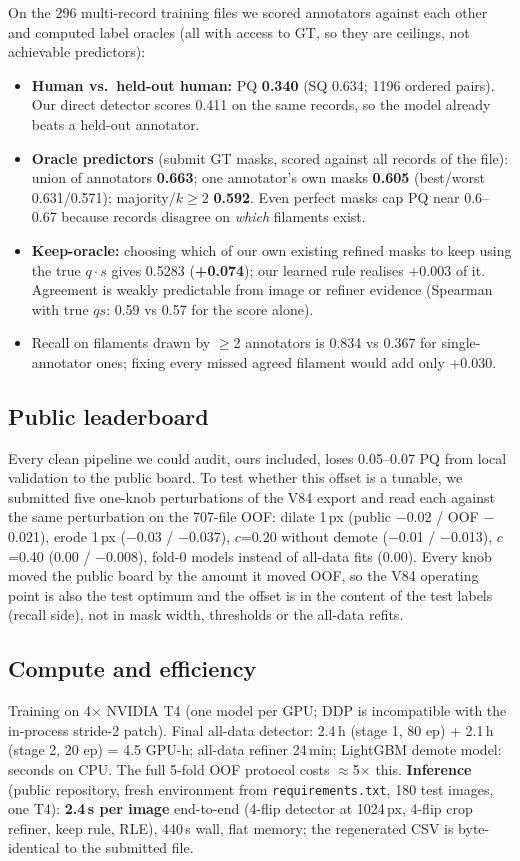 \documentclass[sigconf]{acmart}
\begin{document}
On the 296 multi-record training files we scored annotators against each other and computed label oracles (all with access to GT, so they are ceilings, not achievable predictors):
\begin{itemize}
\item \textbf{Human vs.\ held-out human:} PQ \textbf{0.340} (SQ 0.634; 1196 ordered pairs). Our direct detector scores 0.411 on the same records, so the model already beats a held-out annotator.
\item \textbf{Oracle predictors} (submit GT masks, scored against all records of the file): union of annotators \textbf{0.663}; one annotator's own masks \textbf{0.605} (best/worst 0.631/0.571); majority/$k\ge2$ \textbf{0.592}. Even perfect masks cap PQ near 0.6--0.67 because records disagree on \emph{which} filaments exist.
\item \textbf{Keep-oracle:} choosing which of our own existing refined masks to keep using the true $q\cdot s$ gives 0.5283 (\textbf{+0.074}); our learned rule realises +0.003 of it. Agreement is weakly predictable from image or refiner evidence (Spearman with true $qs$: 0.59 vs 0.57 for the score alone).
\item Recall on filaments drawn by $\ge$2 annotators is 0.834 vs 0.367 for single-annotator ones; fixing every missed agreed filament would add only +0.030.
\end{itemize}

\subsection{Public leaderboard}\label{sec:lb}
Every clean pipeline we could audit, ours included, loses 0.05--0.07 PQ from local validation to the public board. To test whether this offset is a tunable, we submitted five one-knob perturbations of the V84 export and read each against the same perturbation on the 707-file OOF: dilate 1\,px (public $-$0.02 / OOF $-$0.021), erode 1\,px ($-$0.03 / $-$0.037), $c$=0.20 without demote ($-$0.01 / $-$0.013), $c$=0.40 (0.00 / $-$0.008), fold-0 models instead of all-data fits (0.00). Every knob moved the public board by the amount it moved OOF, so the V84 operating point is also the test optimum and the offset is in the content of the test labels (recall side), not in mask width, thresholds or the all-data refits.

\subsection{Compute and efficiency}
Training on 4$\times$ NVIDIA T4 (one model per GPU; DDP is incompatible with the in-process stride-2 patch). Final all-data detector: 2.4\,h (stage 1, 80 ep) + 2.1\,h (stage 2, 20 ep) = 4.5 GPU-h; all-data refiner 24\,min; LightGBM demote model: seconds on CPU. The full 5-fold OOF protocol costs $\approx$5$\times$ this. \textbf{Inference} (public repository, fresh environment from \texttt{requirements.txt}, 180 test images, one T4): \textbf{2.4\,s per image} end-to-end (4-flip detector at 1024\,px, 4-flip crop refiner, keep rule, RLE), 440\,s wall, flat memory; the regenerated CSV is byte-identical to the submitted file.
\end{document}
